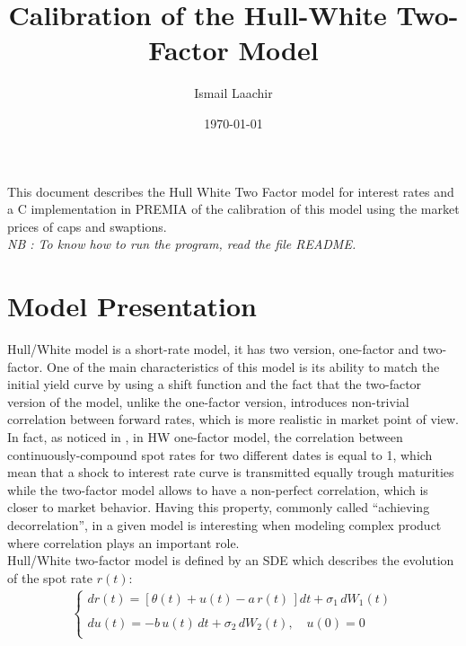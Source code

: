 \documentclass[12pt,a4paper]{article}
\begin{document}
\author{Ismail Laachir}
\title{Calibration of the Hull-White Two-Factor Model}
\date{\today}
\maketitle


\tableofcontents

\vspace{10mm}
  
This document describes the Hull White Two Factor model for interest rates and a C implementation in PREMIA of the calibration of this model using the market prices of caps and swaptions.\\

\textit{NB : To know how to run the program, read the file README.}


\section{Model Presentation}

Hull/White model is a short-rate model, it has two version, one-factor and two-factor. One of the main characteristics of this model is its ability to match the initial yield curve by using a shift function and the fact that the two-factor version of the model, unlike the one-factor version, introduces non-trivial correlation between forward rates, which is more realistic in market point of view. In fact, as noticed in \cite{BM}, in HW one-factor model, the correlation between continuously-compound spot rates for two different dates is equal to 1, which mean that a shock to interest rate curve is transmitted equally trough maturities while the two-factor model allows to have a non-perfect correlation, which is closer to market behavior. Having this property, commonly called ``achieving decorrelation'', in a given model is interesting when modeling complex product where correlation plays an important role.\\

Hull/White two-factor model is defined by an SDE which describes the
evolution of the spot rate $r(t)$:
\begin{equation*}
\begin{array}{l}
\left\{
\begin{array}{l}
dr(t)  = \left[ \theta(t)+ u(t) - a \,r(t)\,\right] dt + \sigma_1\,dW_1(t)\\
\\
du(t)  = -b \,u(t)\,dt + \sigma_2\,dW_2(t), \quad u(0)=0\\
\end{array}
\right.
\end{array}
\end{equation*}
\end{document}
